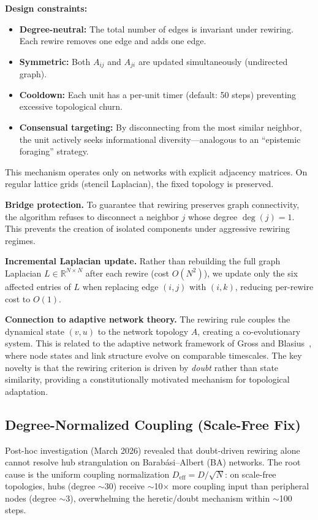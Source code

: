 \documentclass[11pt]{article}
\begin{document}
\textbf{Design constraints:}
\begin{itemize}
    \item \textbf{Degree-neutral:} The total number of edges is invariant under rewiring. Each rewire removes one edge and adds one edge.
    \item \textbf{Symmetric:} Both $A_{ij}$ and $A_{ji}$ are updated simultaneously (undirected graph).
    \item \textbf{Cooldown:} Each unit has a per-unit timer (default: 50 steps) preventing excessive topological churn.
    \item \textbf{Consensual targeting:} By disconnecting from the most similar neighbor, the unit actively seeks informational diversity---analogous to an ``epistemic foraging'' strategy.
\end{itemize}

This mechanism operates only on networks with explicit adjacency matrices. On regular lattice grids (stencil Laplacian), the fixed topology is preserved.

\textbf{Bridge protection.} To guarantee that rewiring preserves graph connectivity, the algorithm refuses to disconnect a neighbor $j$ whose degree $\deg(j) = 1$. This prevents the creation of isolated components under aggressive rewiring regimes.

\textbf{Incremental Laplacian update.} Rather than rebuilding the full graph Laplacian $L \in \mathbb{R}^{N \times N}$ after each rewire (cost $O(N^2)$), we update only the six affected entries of $L$ when replacing edge $(i,j)$ with $(i,k)$, reducing per-rewire cost to $O(1)$.

\textbf{Connection to adaptive network theory.} The rewiring rule couples the dynamical state $(v, u)$ to the network topology $A$, creating a co-evolutionary system. This is related to the adaptive network framework of Gross and Blasius~\cite{gross2008}, where node states and link structure evolve on comparable timescales. The key novelty is that the rewiring criterion is driven by \emph{doubt} rather than state similarity, providing a constitutionally motivated mechanism for topological adaptation.

\subsection{Degree-Normalized Coupling (Scale-Free Fix)}
\label{sec:degree_norm}

Post-hoc investigation (March 2026) revealed that doubt-driven rewiring alone cannot resolve hub strangulation on Barab\'asi--Albert (BA) networks. The root cause is the uniform coupling normalization $D_{\text{eff}} = D/\sqrt{N}$: on scale-free topologies, hubs (degree $\sim$30) receive $\sim$10$\times$ more coupling input than peripheral nodes (degree $\sim$3), overwhelming the heretic/doubt mechanism within $\sim$100 steps.
\end{document}
